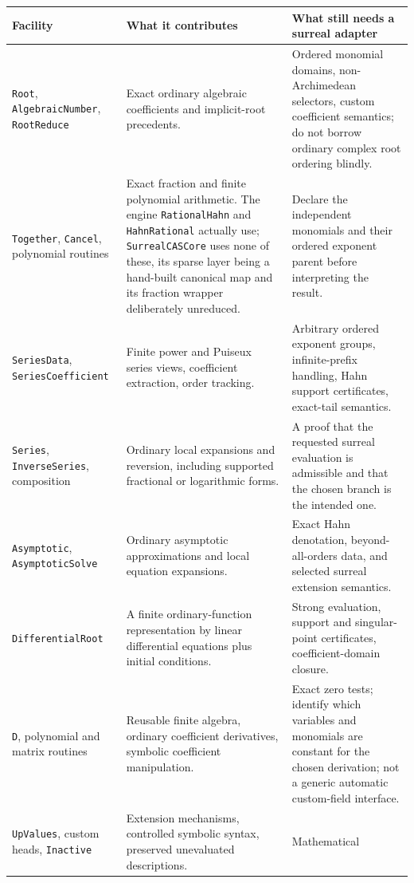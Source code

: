 \documentclass[11pt,letterpaper]{article}
\numberwithin{equation}{section}
\theoremstyle{definition}
\theoremstyle{remark}
\begin{document}
\begingroup\small
\begin{longtable}{@{}P{0.24\textwidth}P{0.33\textwidth}P{0.35\textwidth}@{}}
\toprule
Facility & What it contributes & What still needs a surreal adapter\\
\midrule\endhead
\texttt{Root}, \texttt{AlgebraicNumber}, \texttt{RootReduce} & Exact ordinary
algebraic coefficients and implicit-root precedents. & Ordered monomial domains,
non-Archimedean selectors, custom coefficient semantics; do not borrow ordinary
complex root ordering blindly.\\[0.5em]
\texttt{Together}, \texttt{Cancel}, polynomial routines & Exact fraction and
finite polynomial arithmetic. The engine \texttt{RationalHahn} and
\texttt{HahnRational} actually use; \texttt{SurrealCASCore} uses none of
these, its sparse layer being a hand-built canonical map and its fraction
wrapper deliberately unreduced. &
Declare the independent monomials and their ordered exponent parent before
interpreting the result.\\[0.5em]
\texttt{SeriesData}, \texttt{SeriesCoefficient} & Finite power and Puiseux
series views, coefficient extraction, order tracking. & Arbitrary ordered
exponent groups, infinite-prefix handling, Hahn support certificates, exact-tail
semantics.\\[0.5em]
\texttt{Series}, \texttt{InverseSeries}, composition & Ordinary local expansions
and reversion, including supported fractional or logarithmic forms. & A proof
that the requested surreal evaluation is admissible and that the chosen branch
is the intended one.\\[0.5em]
\texttt{Asymptotic}, \texttt{AsymptoticSolve} & Ordinary asymptotic
approximations and local equation expansions. & Exact Hahn denotation,
beyond-all-orders data, and selected surreal extension semantics.\\[0.5em]
\texttt{DifferentialRoot} & A finite ordinary-function representation by linear
differential equations plus initial conditions. & Strong evaluation, support and
singular-point certificates, coefficient-domain closure.\\[0.5em]
\texttt{D}, polynomial and matrix routines & Reusable finite algebra, ordinary
coefficient derivatives, symbolic coefficient manipulation. & Exact zero tests;
identify which variables and monomials are constant for the chosen derivation;
not a generic automatic custom-field interface.\\[0.5em]
\texttt{UpValues}, custom heads, \texttt{Inactive} & Extension mechanisms,
controlled symbolic syntax, preserved unevaluated descriptions. & Mathematical

\end{longtable}
\end{document}
